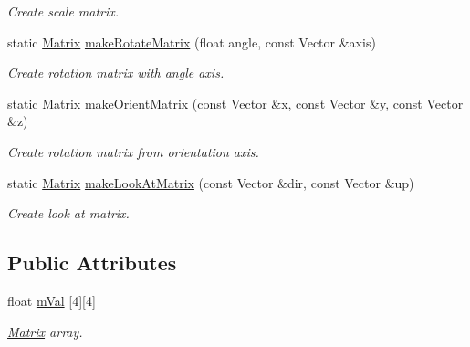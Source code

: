 \begin{DoxyCompactItemize}
\begin{DoxyCompactList}\small\item\em Create scale matrix. \end{DoxyCompactList}\item 
\mbox{\label{class_matrix_a9f8e8e8807dadfd4a87fc3068e7d686f}} 
static \mbox{\hyperlink{class_matrix}{Matrix}} \mbox{\hyperlink{class_matrix_a9f8e8e8807dadfd4a87fc3068e7d686f}{make\+Rotate\+Matrix}} (float angle, const Vector \&axis)
\begin{DoxyCompactList}\small\item\em Create rotation matrix with angle axis. \end{DoxyCompactList}\item 
\mbox{\label{class_matrix_a563b4868e264d58bcae6a34ad171e0c2}} 
static \mbox{\hyperlink{class_matrix}{Matrix}} \mbox{\hyperlink{class_matrix_a563b4868e264d58bcae6a34ad171e0c2}{make\+Orient\+Matrix}} (const Vector \&x, const Vector \&y, const Vector \&z)
\begin{DoxyCompactList}\small\item\em Create rotation matrix from orientation axis. \end{DoxyCompactList}\item 
\mbox{\label{class_matrix_a35f610e34b7958c4abbde1f9130e3f1d}} 
static \mbox{\hyperlink{class_matrix}{Matrix}} \mbox{\hyperlink{class_matrix_a35f610e34b7958c4abbde1f9130e3f1d}{make\+Look\+At\+Matrix}} (const Vector \&dir, const Vector \&up)
\begin{DoxyCompactList}\small\item\em Create look at matrix. \end{DoxyCompactList}\end{DoxyCompactItemize}
\subsection*{Public Attributes}
\begin{DoxyCompactItemize}
\item 
\mbox{\label{class_matrix_aa6fc028a51d19c36dbe6a1ccc9b84454}} 
float \mbox{\hyperlink{class_matrix_aa6fc028a51d19c36dbe6a1ccc9b84454}{m\+Val}} \mbox{[}4\mbox{]}\mbox{[}4\mbox{]}
\begin{DoxyCompactList}\small\item\em \mbox{\hyperlink{class_matrix}{Matrix}} array. \end{DoxyCompactList}\end{DoxyCompactItemize}
